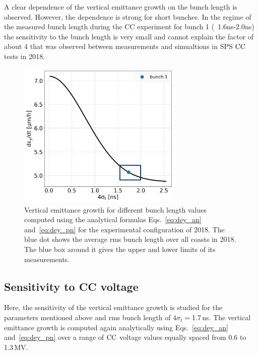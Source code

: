 A clear dependence of the vertical emittance growth on the bunch length is observed. However, the dependence is strong for short bunches. In the regime of the measured bunch length during the CC experiment for bunch 1 (~1.6ns-2.0ns) the sensitivity to the bunch length is very small and cannot explain the factor of about 4 that was observed between measurements and simualtions in SPS ${\mathrm{CC}}$ tests in 2018.

\begin{figure}[!h]
    \centering         
    \includegraphics[width=0.7\textwidth]{images/Ch6/dey_vs_4sigmat_Coast2-Setting2_withBunches_v2.png}
        \caption{Vertical emittance growth for different bunch length values computed using the analytical formulas Eqs.~\eqref{eq:dey_an} and~\eqref{eq:dey_pn} for the experimental configuration of 2018. The blue dot shows the average rms bunch length over all coasts in 2018. The blue box around it gives the upper and lower limits of its measurements.}
        \label{fig:sensitivity_bunch_length_theory_bunch1}
 \end{figure}


\subsection{Sensitivity to CC voltage}\label{subsec:bunch_length_dependence}
Here, the sensitivity of the vertical emittance growth is studied for the parameters mentioned above and rms bunch length of $4\sigma_t=$1.7\,ns. The vertical emittance growth is computed again analytically using Eqs.~\eqref{eq:dey_an} and~\eqref{eq:dey_pn} over a range of ${\mathrm{CC}}$ voltage values equally spaced from 0.6 to 1.3\,MV. 

